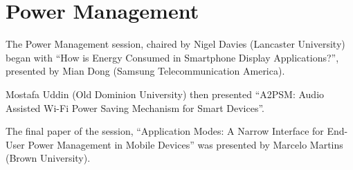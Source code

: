 \section{Power Management}
\label{sec:power}
The Power Management session, chaired by Nigel Davies (Lancaster University)
began with ``How is Energy Consumed in Smartphone Display Applications?'', presented by Mian Dong (Samsung Telecommunication America).

Mostafa Uddin (Old Dominion University) then presented ``A2PSM: Audio Assisted 
Wi-Fi Power Saving Mechanism for Smart Devices''.

The final paper of the session, ``Application Modes: A Narrow Interface for End-
User Power Management in Mobile Devices'' was presented by Marcelo Martins (Brown 
University).